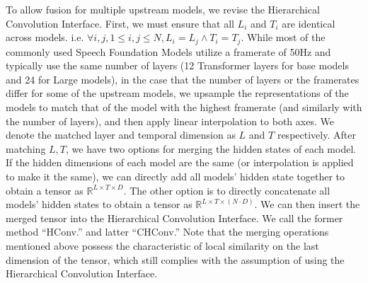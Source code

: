 To allow fusion for multiple upstream models, we revise the Hierarchical Convolution Interface.
First, we must ensure that all $L_i$ and $T_i$ are identical across models. i.e. $\forall i,j, 1\leq i,j \leq N, L_i=L_j \wedge T_i=T_j$.
While most of the commonly used Speech Foundation Models utilize a framerate of 50Hz and typically use the same number of layers (12 Transformer layers for base models and 24 for Large models), in the case that the number of layers or the framerates differ for some of the upstream models, we upsample the representations of the models to match that of the model with the highest framerate (and similarly with the number of layers), and then apply linear interpolation to both axes.
We denote the matched layer and temporal dimension as $L$ and $T$ respectively.
After matching $L,T$, we have two options for merging the hidden states of each model.
If the hidden dimensions of each model are the same (or interpolation is applied to make it the same), we can directly add all models' hidden state together to obtain a tensor as $\mathbb{R}^{L \times T\times D}$.
The other option is to directly concatenate all models' hidden states to obtain a tensor as $\mathbb{R}^{L \times T\times \left(N \cdot D\right)}$.
We can then insert the merged tensor into the Hierarchical Convolution Interface.
We call the former method ``HConv.'' and latter ``CHConv.''
Note that the merging operations mentioned above possess the characteristic of local similarity on the last dimension of the tensor, which still complies with the assumption of using the Hierarchical Convolution Interface.





